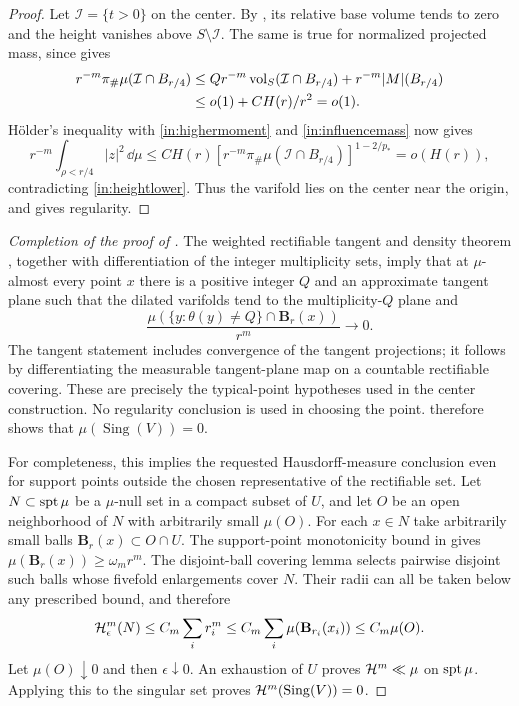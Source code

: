 \begin{proof}
Let $\mathcal I=\{t>0\}$ on the center.  By , its
relative base volume tends to zero and the height vanishes above
$S\setminus\mathcal I$.  The same is true for normalized projected
mass, since  gives
\begin{equation}\label{in:influencemass}
 \begin{split}
 r^{-m}\pi_\#\mu(\mathcal I\cap B_{r/4})
 &\leq Qr^{-m}\operatorname{vol}_S(\mathcal I\cap B_{r/4})
                  +r^{-m}|M|(B_{r/4})\\
 &\leq o(1)+CH(r)/r^2=o(1).
 \end{split}
\end{equation}
H\"older's inequality with \eqref{in:highermoment} and
\eqref{in:influencemass} now gives
\[
 r^{-m}\int_{\rho<r/4}|z|^2\,\dd\mu
 \leq CH(r)
   \left[r^{-m}\pi_\#\mu(\mathcal I\cap B_{r/4})\right]^{1-2/p_*}
 =o(H(r)),
\]
contradicting \eqref{in:heightlower}.  Thus the varifold lies on the
center near the origin, and  gives regularity.
\end{proof}

\begin{proof}[Completion of the proof of ]
The weighted rectifiable tangent and density theorem
\cite[Chapter~3, Definition~1.7, Remark~1.8, and Theorem~1.9]{Simon2018},
together with differentiation of the integer multiplicity sets,
imply that at $\mu$-almost every point $x$ there is a positive integer $Q$ and
an approximate tangent plane such that the dilated varifolds tend to
the multiplicity-$Q$ plane and
\[
 \frac{\mu(\{y:\theta(y)\ne Q\}\cap \mathbf B_r(x))}{r^m}
                         \longrightarrow0.
\]
The tangent statement includes convergence of the tangent projections;
it follows by differentiating the measurable tangent-plane map on a
countable rectifiable covering.  These are precisely the typical-point
hypotheses used in the center construction.  No regularity conclusion
is used in choosing the point.   therefore shows that
$\mu(\operatorname{Sing}(V))=0$.

For completeness, this implies the requested Hausdorff-measure
conclusion even for support points outside the chosen representative
of the rectifiable set.  Let $N\subset\operatorname{spt}\mu$ be a $\mu$-null set
in a compact subset of $U$, and let $O$ be an open neighborhood of
$N$ with arbitrarily small $\mu(O)$.  For each $x\in N$ take arbitrarily
small balls $\mathbf B_r(x)\subset O\cap U$.  The support-point
monotonicity bound in  gives
$\mu(\mathbf B_r(x))\geq\omega_m r^m$.  The disjoint-ball covering
lemma selects pairwise disjoint such balls whose fivefold enlargements
cover $N$.  Their radii can all be taken below any prescribed bound,
and therefore
\[
 \mathcal H^m_{\epsilon}(N)
       \leq C_m\sum_i r_i^m
       \leq C_m\sum_i\mu(\mathbf B_{r_i}(x_i))
       \leq C_m\mu(O).
\]
Let $\mu(O)\downarrow0$ and then $\epsilon\downarrow0$.
An exhaustion of $U$ proves $\mathcal H^m\ll\mu$ on $\operatorname{spt}\mu$.
Applying this to the singular set proves
$\mathcal H^m(\operatorname{Sing}(V))=0$.
\end{proof}
